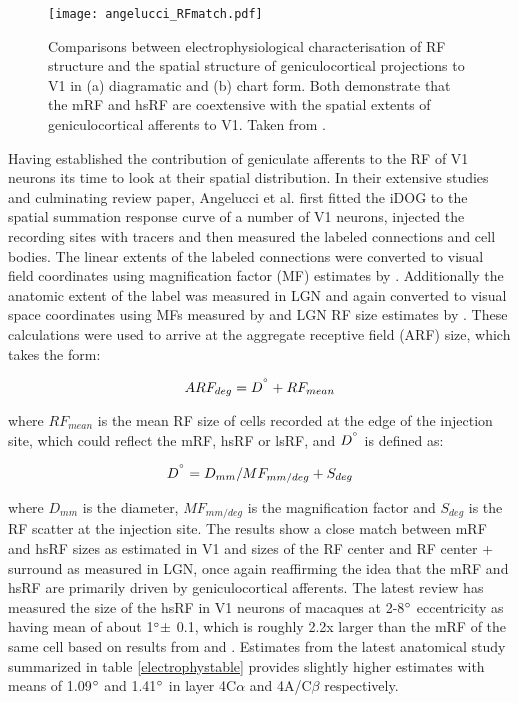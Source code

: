\begin{figure}
	\centering
        \texttt{[image: angelucci\_RFmatch.pdf]}
	\caption{Comparisons between electrophysiological
        characterisation of RF structure and the spatial structure of
        geniculocortical projections to V1 in (a) diagramatic and (b)
        chart form. Both demonstrate that the mRF and hsRF are
        coextensive with the spatial extents of geniculocortical
        afferents to V1. Taken from \cite{Angelucci2006}.}
	\label{FFmatch}
\end{figure}

Having established the contribution of geniculate afferents to the RF
of V1 neurons its time to look at their spatial distribution. In their
extensive studies and culminating review paper, Angelucci et al.
\cite{Angelucci2006} first fitted the iDOG to the spatial summation
response curve of a number of V1 neurons, injected the recording sites
with tracers and then measured the labeled connections and cell
bodies. The linear extents of the labeled connections were converted
to visual field coordinates using magnification factor (MF) estimates
by \cite{VanEssen1984}. Additionally the anatomic extent of the label
was measured in LGN and again converted to visual space coordinates
using MFs measured by \cite{Connolly1984} and LGN RF size estimates by
\cite{Derrington1984}. These calculations were used to arrive at the
aggregate receptive field (ARF) size, which takes the form:

\begin{equation}
  ARF_{deg} = D^{\degree} + RF_{mean}
\end{equation}

where $RF_{mean}$ is the mean RF size of cells recorded at the edge of
the injection site, which could reflect the mRF, hsRF or lsRF, and
$D^{\degree}$ is defined as:

\begin{equation}
  D^{\degree} = D_{mm} / MF_{mm/deg} + S_{deg}
\end{equation}

where $D_{mm}$ is the diameter, $MF_{mm/deg}$ is the magnification
factor and $S_{deg}$ is the RF scatter at the injection site. The
results show a close match between mRF and hsRF sizes as estimated in
V1 and sizes of the RF center and RF center + surround as measured in
LGN, once again reaffirming the idea that the mRF and hsRF are
primarily driven by geniculocortical afferents. The latest review
\citep{Angelucci2006} has measured the size of the hsRF in V1 neurons
of macaques at 2-8$\degree$ eccentricity as having mean of about
1$\degree \pm$ 0.1, which is roughly 2.2x larger than the mRF of the
same cell based on results from \cite{Angelucci2002} and
\cite{Levitt2002}. Estimates from the latest anatomical study
summarized in table \ref{electrophystable} provides slightly higher
estimates with means of 1.09$\degree$ and 1.41$\degree$ in layer
4C$\alpha$ and 4A/C$\beta$ respectively.


